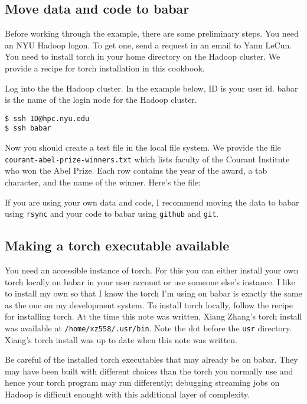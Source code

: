 \documentclass{article}
\let\code\texttt %
\begin{document}
\subsection{Move data and code to babar}

Before working through the example, there are some preliminary steps.
You need an NYU Hadoop logon. To get one, send a request in an email to
Yann LeCun. You need to install torch in your home directory 
on the Hadoop cluster. We provide a recipe for torch
installation in this cookbook.

Log into the the Hadoop cluster. In the example below, ID is your user
id. babar is the name of the login node for the Hadoop cluster.

\begin{verbatim}
$ ssh ID@hpc.nyu.edu
$ ssh babar 
\end{verbatim}


Now you should create a test file in the local file system. We provide
the file \code{courant-abel-prize-winners.txt} which lists faculty of the
Courant Institute who won the Abel Prize. Each row contains the year of
the award, a tab character, and the name of the winner. Here's the file:



If you are using your own data and code, I recommend moving the data to
babar using \code{rsync} and your code to babar using \code{github} and 
\code{git}.

\subsection{Making a torch executable available}

You need an accessible instance of torch. For this you can either
install your own torch locally on babar in your user account or use
someone else's instance. I like to install my own so that I know the
torch I'm using on babar is exactly the same as the one on my
development system. To install torch locally, follow the recipe for
installing torch. At the time this note was written, Xiang
Zhang's torch install was available at \code{/home/xz558/.usr/bin}. Note
the dot before the \code{usr} directory. Xiang's torch install was up to
date when this note was written.

Be careful of the installed torch executables that may already
be on babar. They may have been built with different choices than the
torch you normally use and hence your torch program may run differently;
debugging streaming jobs on Hadoop is difficult enought with this
additional layer of complexity.
\end{document}
